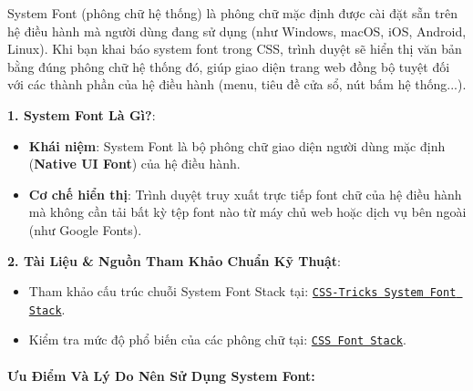 \documentclass[11pt,oneside]{book}
\newcommand{\codeinline}[1]{\textcolor{accentOrange}{\texttt{#1}}}
\newcommand{\term}[1]{\textbf{\textcolor{primaryBlue}{#1}}}
\begin{document}
System Font (phông chữ hệ thống) là phông chữ mặc định được cài đặt sẵn trên hệ điều hành mà người dùng đang sử dụng (như Windows, macOS, iOS, Android, Linux). Khi bạn khai báo system font trong CSS, trình duyệt sẽ hiển thị văn bản bằng đúng phông chữ hệ thống đó, giúp giao diện trang web đồng bộ tuyệt đối với các thành phần của hệ điều hành (menu, tiêu đề cửa sổ, nút bấm hệ thống...).

\begin{conceptBox}
\textbf{1. System Font Là Gì?}:
\begin{itemize}[leftmargin=1.5em, itemsep=3pt, parsep=0pt]
    \item \textbf{Khái niệm}: System Font là bộ phông chữ giao diện người dùng mặc định (\term{Native UI Font}) của hệ điều hành.
    \item \textbf{Cơ chế hiển thị}: Trình duyệt truy xuất trực tiếp font chữ của hệ điều hành mà không cần tải bất kỳ tệp font nào từ máy chủ web hoặc dịch vụ bên ngoài (như Google Fonts).
\end{itemize}
\textbf{2. Tài Liệu \& Nguồn Tham Khảo Chuẩn Kỹ Thuật}:
\begin{itemize}[leftmargin=1.5em, itemsep=3pt, parsep=0pt]
    \item Tham khảo cấu trúc chuỗi System Font Stack tại: \href{https://css-tricks.com/snippets/css/system-font-stack/}{\codeinline{CSS-Tricks System Font Stack}}.
    \item Kiểm tra mức độ phổ biến của các phông chữ tại: \href{https://www.cssfontstack.com/}{\codeinline{CSS Font Stack}}.
\end{itemize}
\end{conceptBox}

\paragraph{Ưu Điểm Và Lý Do Nên Sử Dụng System Font:}
\end{document}
